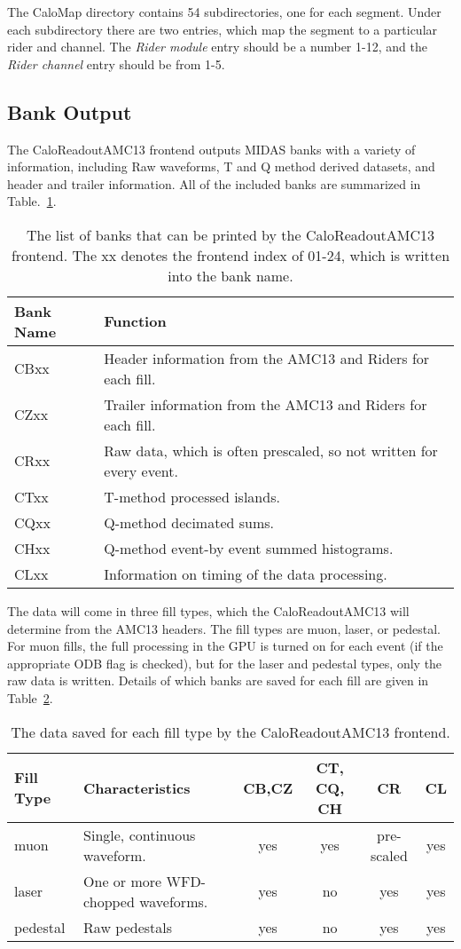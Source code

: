 The CaloMap directory contains 54 subdirectories, one for each segment. Under each subdirectory there are two entries, which map the segment to a particular rider and channel. The \emph{Rider module} entry should be a number 1-12, and the \emph{Rider channel} entry should be from 1-5.

\subsection{Bank Output}

The CaloReadoutAMC13 frontend outputs MIDAS banks with a variety of information, including Raw waveforms, T and Q method derived datasets, and header and trailer information. All of the included banks are summarized in Table.~\ref{tab:banks}. 

\begin{table}
\begin{tabular}{|l|l|}
\hline
Bank Name & Function\\
\hline
CBxx & Header information from the AMC13 and Riders for each fill.\\
CZxx & Trailer information from the AMC13 and Riders for each fill.\\
CRxx & Raw data, which is often prescaled, so not written for every event.\\
CTxx & T-method processed islands.\\
CQxx & Q-method decimated sums.\\
CHxx & Q-method event-by event summed histograms.\\
CLxx & Information on timing of the data processing.\\
\hline
\end{tabular}
\caption{\label{tab:banks}The list of banks that can be printed by the CaloReadoutAMC13 frontend. The xx denotes the frontend index of 01-24, which is written into the bank name.}
\end{table}

The data will come in three fill types, which the CaloReadoutAMC13 will determine from the AMC13 headers. The fill types are muon, laser, or pedestal. For muon fills, the full processing in the GPU is turned on for each event (if the appropriate ODB flag is checked), but for the laser and pedestal types, only the raw data is written. Details of which banks are saved for each fill are given in Table~\ref{tab:fills}.

\begin{table}
\begin{tabular}{|l|l|c|c|c|c|}
\hline
Fill Type & Characteristics & CB,CZ & CT, CQ, CH & CR & CL\\
\hline
muon & Single, continuous waveform. & yes & yes & pre-scaled & yes\\
\hline
laser & \multicolumn{1}{m{5cm}|}{One or more WFD-chopped waveforms.} & yes & no & yes & yes\\
\hline
pedestal & \multicolumn{1}{m{3cm}|}{Raw pedestals} & yes & no & yes & yes\\
\hline
\end{tabular}
\caption{\label{tab:fills}The data saved for each fill type by the CaloReadoutAMC13 frontend.}
\end{table}

